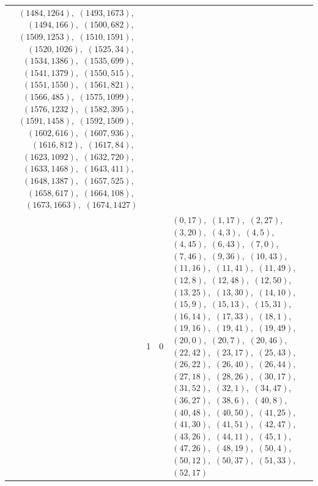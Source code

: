 \documentclass[11pt]{article}
\begin{document}
\begin{longtable}{@{}rrl>{\raggedright\arraybackslash}p{}@{}}
$(1484,1264)$,\allowbreak\ $(1493,1673)$,\allowbreak\ $(1494,166)$,\allowbreak\ $(1500,682)$,\allowbreak\ $(1509,1253)$,\allowbreak\ $(1510,1591)$,\allowbreak\ $(1520,1026)$,\allowbreak\ $(1525,34)$,\allowbreak\ $(1534,1386)$,\allowbreak\ $(1535,699)$,\allowbreak\ $(1541,1379)$,\allowbreak\ $(1550,515)$,\allowbreak\ $(1551,1550)$,\allowbreak\ $(1561,821)$,\allowbreak\ $(1566,485)$,\allowbreak\ $(1575,1099)$,\allowbreak\ $(1576,1232)$,\allowbreak\ $(1582,395)$,\allowbreak\ $(1591,1458)$,\allowbreak\ $(1592,1509)$,\allowbreak\ $(1602,616)$,\allowbreak\ $(1607,936)$,\allowbreak\ $(1616,812)$,\allowbreak\ $(1617,84)$,\allowbreak\ $(1623,1092)$,\allowbreak\ $(1632,720)$,\allowbreak\ $(1633,1468)$,\allowbreak\ $(1643,411)$,\allowbreak\ $(1648,1387)$,\allowbreak\ $(1657,525)$,\allowbreak\ $(1658,617)$,\allowbreak\ $(1664,108)$,\allowbreak\ $(1673,1663)$,\allowbreak\ $(1674,1427)$\\
\addlinespace[3pt]
53 & 1 & $0$ & $(0,17)$,\allowbreak\ $(1,17)$,\allowbreak\ $(2,27)$,\allowbreak\ $(3,20)$,\allowbreak\ $(4,3)$,\allowbreak\ $(4,5)$,\allowbreak\ $(4,45)$,\allowbreak\ $(6,43)$,\allowbreak\ $(7,0)$,\allowbreak\ $(7,46)$,\allowbreak\ $(9,36)$,\allowbreak\ $(10,43)$,\allowbreak\ $(11,16)$,\allowbreak\ $(11,41)$,\allowbreak\ $(11,49)$,\allowbreak\ $(12,8)$,\allowbreak\ $(12,48)$,\allowbreak\ $(12,50)$,\allowbreak\ $(13,25)$,\allowbreak\ $(13,30)$,\allowbreak\ $(14,10)$,\allowbreak\ $(15,9)$,\allowbreak\ $(15,13)$,\allowbreak\ $(15,31)$,\allowbreak\ $(16,14)$,\allowbreak\ $(17,33)$,\allowbreak\ $(18,1)$,\allowbreak\ $(19,16)$,\allowbreak\ $(19,41)$,\allowbreak\ $(19,49)$,\allowbreak\ $(20,0)$,\allowbreak\ $(20,7)$,\allowbreak\ $(20,46)$,\allowbreak\ $(22,42)$,\allowbreak\ $(23,17)$,\allowbreak\ $(25,43)$,\allowbreak\ $(26,22)$,\allowbreak\ $(26,40)$,\allowbreak\ $(26,44)$,\allowbreak\ $(27,18)$,\allowbreak\ $(28,26)$,\allowbreak\ $(30,17)$,\allowbreak\ $(31,52)$,\allowbreak\ $(32,1)$,\allowbreak\ $(34,47)$,\allowbreak\ $(36,27)$,\allowbreak\ $(38,6)$,\allowbreak\ $(40,8)$,\allowbreak\ $(40,48)$,\allowbreak\ $(40,50)$,\allowbreak\ $(41,25)$,\allowbreak\ $(41,30)$,\allowbreak\ $(41,51)$,\allowbreak\ $(42,47)$,\allowbreak\ $(43,26)$,\allowbreak\ $(44,11)$,\allowbreak\ $(45,1)$,\allowbreak\ $(47,26)$,\allowbreak\ $(48,19)$,\allowbreak\ $(50,4)$,\allowbreak\ $(50,12)$,\allowbreak\ $(50,37)$,\allowbreak\ $(51,33)$,\allowbreak\ $(52,17)$\\

\end{longtable}
\end{document}
